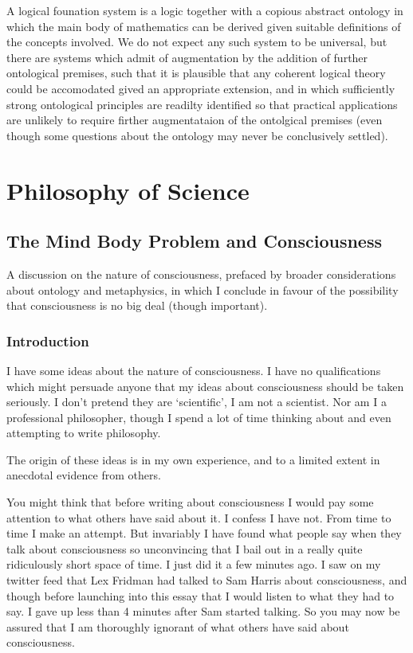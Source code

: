 \documentclass[10pt,titlepage]{book}
\begin{document}
A logical founation system is a logic together with a copious abstract ontology in which the main body of mathematics can be derived given suitable definitions of the concepts involved.
We do not expect any such system to be universal, but there are systems which admit of augmentation by the addition of further ontological premises, such that it is plausible that any coherent logical theory could be accomodated gived an appropriate extension, and in which sufficiently strong ontological principles are readilty identified so that practical applications are unlikely to require firther augmentataion of the ontolgical premises (even though some questions about the ontology may never be conclusively settled).

\part{Philosophy of Science}

\chapter{The Mind Body Problem and Consciousness}
A discussion on the nature of consciousness, prefaced by broader considerations about ontology and metaphysics, in which I conclude in favour of the possibility that consciousness is no big deal (though important).

\section{Introduction}

I have some ideas about the nature of consciousness.
I have no qualifications which might persuade anyone that my ideas about consciousness should be taken seriously.
I don't pretend they are `scientific', I am not a scientist.
Nor am I a professional philosopher, though I spend a lot of time thinking about and even attempting to write philosophy.

The origin of these ideas is in my own experience, and to a limited extent in anecdotal evidence from others.

You might think that before writing about consciousness I would pay some attention to what others have said about it.
I confess I have not.
From time to time I make an attempt.
But invariably I have found what people say when they talk about consciousness so unconvincing that I bail out in a really quite ridiculously short space of time.
I just did it a few minutes ago.
I saw on my twitter feed that Lex Fridman had talked to Sam Harris about consciousness, and though before launching into this essay that I would listen to what they had to say.
I gave up less than 4 minutes after Sam started talking.
So you may now be assured that I am thoroughly ignorant of what others have said about consciousness.
\end{document}
